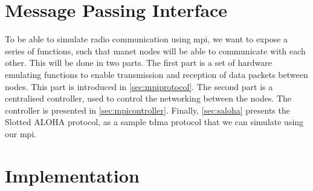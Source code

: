 \chapter{Message Passing Interface}

To be able to simulate radio communication using \gls{mpi}, we want to expose a series of functions, such that \gls{manet} nodes will be able to communicate with each other. This will be done in two parts. The first part is a set of hardware emulating functions to enable transmission and reception of data packets between nodes. This part is introduced in \autoref{sec:mpiprotocol}. The second part is a centralised controller, used to control the networking between the nodes. The controller is presented in \autoref{sec:mpicontroller}. Finally, \autoref{sec:saloha} presents the Slotted ALOHA protocol, as a sample \gls{tdma} protocol that we can simulate using our \gls{mpi}.





\chapter{Implementation}
